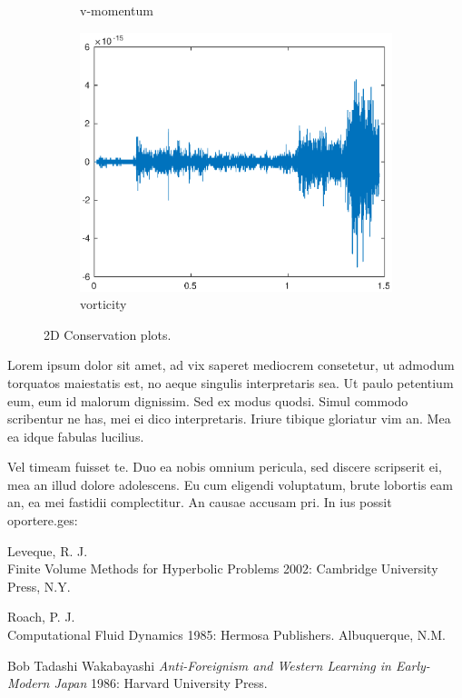 \begin{figure}[htp]
\begin{subfigure}[b]{0.3\textwidth}
        \caption{v-momentum}
        \label{fig:Mass}
    \end{subfigure}
    \hfill
    \begin{subfigure}[b]{0.3\textwidth}
        \centering
        \includegraphics[width=\textwidth]{images/cons_vort.eps}\hfill
        \caption{vorticity}
        \label{Momentum}
    \end{subfigure}
     \hfill
    \caption{2D Conservation plots.}
    \label{fig:three graphs}
\end{figure}

Lorem ipsum dolor sit amet, ad vix saperet mediocrem consetetur, ut admodum torquatos maiestatis est, 
no aeque singulis interpretaris sea. Ut paulo petentium eum, eum id malorum dignissim. Sed ex modus quodsi. 
Simul commodo scribentur ne has, mei ei dico interpretaris. Iriure tibique gloriatur vim an. Mea ea idque 
fabulas lucilius.

Vel timeam fuisset te. Duo ea nobis omnium pericula, sed discere scripserit ei, mea an illud dolore adolescens.
 Eu cum eligendi voluptatum, brute lobortis eam an, ea mei fastidii complectitur. An causae accusam pri. 
 In ius possit oportere.ges:




\begin{thebibliography}{1}

  Leveque, R. J. {\\Finite Volume Methods for Hyperbolic Problems} 2002:
Cambridge University Press, N.Y.

 Roach, P. J. {\\Computational Fluid Dynamics} 1985: Hermosa Publishers. Albuquerque, N.M.

 Bob Tadashi Wakabayashi {\em Anti-Foreignism and Western
Learning in Early-Modern Japan} 1986: Harvard University Press.

\end{thebibliography}